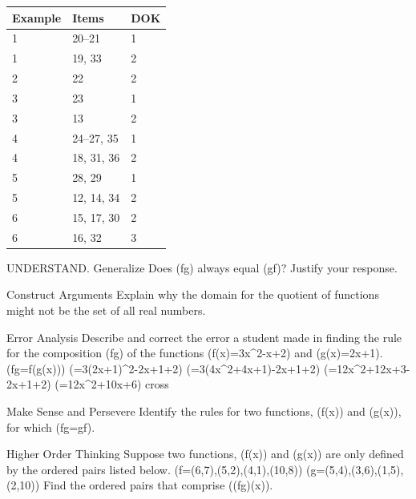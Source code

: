 \documentclass{article}
\newenvironment{item-analysis}{}{}      %
\newenvironment{practice}[2]{}{}        %
\newcommand{\answer}[1]{}               %
\begin{document}
\begin{item-analysis}
\begin{tabular}{lll}
\toprule
Example & Items & DOK \\
\midrule
1 & 20--21 & 1 \\
1 & 19, 33 & 2 \\
2 & 22 & 2 \\
3 & 23 & 1 \\
3 & 13 & 2 \\
4 & 24--27, 35 & 1 \\
4 & 18, 31, 36 & 2 \\
5 & 28, 29 & 1 \\
5 & 12, 14, 34 & 2 \\
6 & 15, 17, 30 & 2 \\
6 & 16, 32 & 3 \\
\bottomrule
\end{tabular}
\end{item-analysis}
\begin{practice}{12}{2}
UNDERSTAND. Generalize Does (f\circ g) always equal (g\circ f)? Justify your response.
\answer{In general (f\circ g) and (g\circ f) are usually not equal. Sample: If (f(x)=x+1) and (g(x)=4x), then ((f\circ g)(x)=4x+1) and ((g\circ f)(x)=4x+4).}
\end{practice}
\begin{practice}{13}{2}
Construct Arguments Explain why the domain for the quotient of functions might not be the set of all real numbers.
\answer{because there are restrictions on the x-values in the denominator of a fraction such that it cannot be defined}
\end{practice}
\begin{practice}{14}{2}
Error Analysis Describe and correct the error a student made in finding the rule for the composition (f\circ g) of the functions (f(x)=3x^2-x+2) and (g(x)=2x+1).
(f\circ g=f(g(x)))
(=3(2x+1)^2-2x+1+2)
(=3(4x^2+4x+1)-2x+1+2)
(=12x^2+12x+3-2x+1+2)
(=12x^2+10x+6) cross
\answer{When (2x+1) was substituted into (3x^2-x+2) for x and when (-x) was replaced with (2x+1), the negative sign was not distributed.}
\end{practice}
\begin{practice}{15}{2}
Make Sense and Persevere Identify the rules for two functions, (f(x)) and (g(x)), for which (f\circ g=g\circ f).
\answer{Answers may vary. Sample: When (f(x)=2x) and (g(x)=5x), ((f\circ g)(x)=10x) and ((g\circ f)(x)=10x).}
\end{practice}
\begin{practice}{16}{3}
Higher Order Thinking Suppose two functions, (f(x)) and (g(x)) are only defined by the ordered pairs listed below.
(f=(6,7),(5,2),(4,1),(10,8))
(g=(5,4),(3,6),(1,5),(2,10))
Find the ordered pairs that comprise ((f\circ g)(x)).
\answer{((f\circ g)(x)=\{(5,1),(3,7),(1,2),(2,8)\})}
\end{practice}
\end{document}
